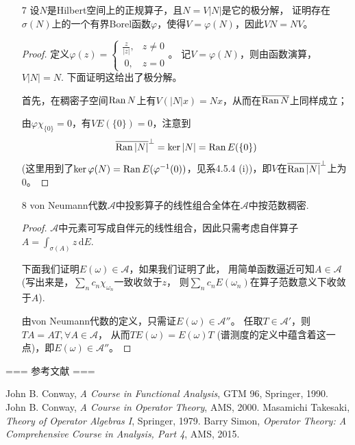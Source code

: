 \begin{enumerate}
\begin{proof}
    任取$x=|A|y\in\Ran|A|$，有\[VTx=VT|A|y=V|A|Ty=ATy=TAy=TV|A|y=TVx.\]任取$x\in\overline{\Ran|A|}^\perp=\ker|A|$，
    有$|A|Tx=T|A|x=0$，即$Tx\in\ker|A|$，故$VTx=0=TVx$.

    再举例说明$V$不一定属于$C^*(A)$. 令$A$为一个无限维且无限余维的紧算子(如$H=l^2,A((a_1,a_2,\cdots))=(a_1,0,\frac{a_2}{2},0,\frac{a_3}{3},\cdots)$).
    由于$\C\cdot I+\mathcal{K}(H)$为$C^*$-代数，故若$V\in C^*(A)$，则存在$\gamma\in\C$与紧算子$K$使得$V=\gamma+K$.
    由$V^*V=P_{\overline{\Ran|A|}}$知$|\gamma|=1$，从而$V^*V$形如$I-D$，其中$D$为紧算子. 
    然而$D=P_{\overline{\Ran|A|}^\perp}$是无限秩投影算子，不是紧的，产生矛盾，因此$V\notin C^*(A)$.
\end{proof}

\item[7] 设$N$是Hilbert空间上的正规算子，且$N=V|N|$是它的极分解，
证明存在$\sigma(N)$上的一个有界Borel函数$\varphi$，使得$V=\varphi(N)$，因此$VN=NV$。
\begin{proof}
定义$\varphi(z)=\begin{cases}\frac{z}{|z|},&z\neq 0\\
    \ 0,&z=0\end{cases}$。
记$V=\varphi(N)$，则由函数演算，$V|N|=N$. 下面证明这给出了极分解。

首先，在稠密子空间$\operatorname{Ran} N$上有$V(|N|x)=Nx$，从而在$\overline{\operatorname{Ran} N}$上同样成立；

由$\varphi\chi_{\{0\}}=0$，有$VE(\{0\})=0$，注意到
\[\overline{\operatorname{Ran}|N|}^\perp=\ker|N|=\operatorname{Ran} E(\{0\})\]
(这里用到了$\ker\varphi(N)=\operatorname{Ran} E(\varphi^{-1}(0))$，见系4.5.4 (i))，即$V$在$\overline{\operatorname{Ran}|N|}^\perp$上为$0$。
\end{proof}

\item[8]
von Neumann代数$\mathscr{A}$中投影算子的线性组合全体在$\mathscr{A}$中按范数稠密.
\begin{proof}
$\mathscr{A}$中元素可写成自伴元的线性组合，因此只需考虑自伴算子$A=\int_{\sigma(A)}z\,\mathrm{d}E.$

下面我们证明$E(\omega)\in \mathscr{A}$，如果我们证明了此，
用简单函数逼近可知$A\in \mathscr{A}$ (写出来是，$\sum_n c_n\chi_{\omega_n}$一致收敛于$z$，
则$\sum_n c_nE(\omega_n)$在算子范数意义下收敛于$A$).

由von Neumann代数的定义，只需证$E(\omega)\in \mathscr{A}''$。
任取$T\in \mathscr{A}'$，则$TA=AT,\forall A\in\mathscr{A}$，
从而$TE(\omega)=E(\omega)T$ (谱测度的定义中蕴含着这一点)，即$E(\omega)\in \mathscr{A}''$。
\end{proof}
\end{enumerate}

=== 参考文献 ===
\begin{references}
        John B. Conway, \textit{A Course in Functional Analysis}, 
        GTM 96, Springer, 1990.
        John B. Conway, \textit{A Course in Operator Theory}, AMS, 2000.
        Masamichi Takesaki, \textit{Theory of Operator Algebras I},  
        Springer, 1979.
        Barry Simon, \textit{Operator Theory:
        A Comprehensive Course in Analysis, Part 4}, AMS, 2015.
\end{references}
